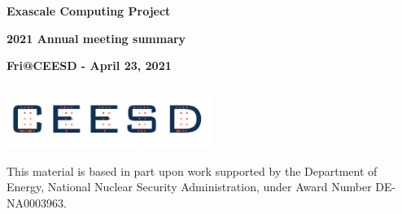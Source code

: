 \documentclass{beamer}
\begin{document}
\begin{frame}\frametitle{}
\vspace*{0.2in}
\centerline{\textrm{{\huge\bfseries\color{myOrange} Exascale Computing Project}}}
\smallskip
\centerline{\textrm{{\huge\bfseries\color{myOrange} 2021 Annual meeting summary}}}
\smallskip
\smallskip
\centerline{\textrm{{\large\bfseries{Fri@CEESD - April 23, 2021}}}}
\vspace*{0.2in}
\begin{center}
\vspace*{0.4in}
\end{center}
\end{frame}



\begin{frame}\frametitle{}
  \vspace*{0.2in}
  
\begin{center}
\includegraphics[width=0.5\textwidth]{ceesd-logo-2.pdf}\\

\vspace*{0.35in}

\vspace*{0.5in}
\begin{minipage}{0.8\textwidth}
This material is based in part upon work supported by the Department of Energy, National Nuclear Security Administration, under Award Number DE-NA0003963. 
\end{minipage}
\end{center}


\end{frame}
\end{document}

